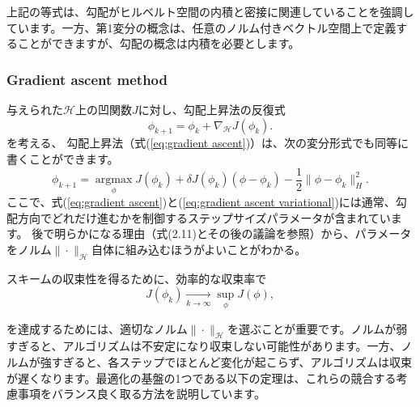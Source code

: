 \documentclass{jsarticle}
\theoremstyle{definition}
\begin{document}
上記の等式は、勾配がヒルベルト空間の内積と密接に関連していることを強調しています。一方、第1変分の概念は、任意のノルム付きベクトル空間上で定義することができますが、勾配の概念は内積を必要とします。



\subsubsection{Gradient ascent method}
\label{sect: Gradient ascent method}

与えられた$\mathcal{H}$上の凹関数$J$に対し、勾配上昇法の反復式
\begin{equation}
    \label{eq:gradient ascent}
    \phi_{k+1} = \phi_k + \nabla_\mathcal{H} J(\phi_k).
\end{equation}
を考える、
勾配上昇法（式(\ref{eq:gradient ascent})）は、次の変分形式でも同等に書くことができます。
\begin{equation}
    \label{eq:gradient ascent variational}
    \phi_{k+1} =  \underset{\phi} {\operatorname{argmax}} J(\phi_k) + \delta J(\phi_k)(\phi-\phi_k) - \frac{1}{2}\|\phi-\phi_k\|_H^2.
\end{equation}
ここで、式(\ref{eq:gradient ascent})と(\ref{eq:gradient ascent variational})には通常、勾配方向でどれだけ進むかを制御するステップサイズパラメータが含まれています。
後で明らかになる理由（式(2.11)とその後の議論を参照）から、パラメータをノルム$\|\cdot\|_\mathcal{H}$自体に組み込むほうがよいことがわかる。

スキームの収束性を得るために、効率的な収束率で
$$
J(\phi_k) \xrightarrow[k \to \infty]{} \sup_\phi J(\phi),
$$

を達成するためには、適切なノルム$\|\cdot\|_\mathcal{H}$を選ぶことが重要です。ノルムが弱すぎると、アルゴリズムは不安定になり収束しない可能性があります。一方、ノルムが強すぎると、各ステップでほとんど変化が起こらず、アルゴリズムは収束が遅くなります。最適化の基盤の1つである以下の定理は、これらの競合する考慮事項をバランス良く取る方法を説明しています。
\end{document}
